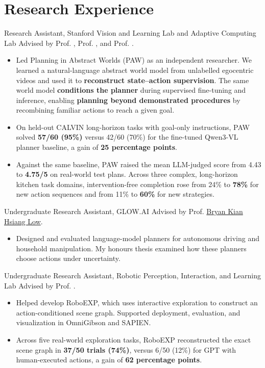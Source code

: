 \section{Research Experience}
  {Research Assistant, Stanford Vision and Learning Lab and Adaptive Computing Lab}{}
Advised by Prof. \jiajun, Prof. \david, and Prof. \weiyu.
\begin{itemize}
  \item Led Planning in Abstract Worlds (PAW) as an independent researcher. We learned a natural-language abstract world model from unlabelled egocentric videos and used it to \textbf{reconstruct state--action supervision}. The same world model \textbf{conditions the planner} during supervised fine-tuning and inference, enabling \textbf{planning beyond demonstrated procedures} by recombining familiar actions to reach a given goal.
  \item On held-out CALVIN long-horizon tasks with goal-only instructions, PAW solved \textbf{57/60 (95\%)} versus 42/60 (70\%) for the fine-tuned Qwen3-VL planner baseline, a gain of \textbf{25 percentage points}.
  \item Against the same baseline, PAW raised the mean LLM-judged score from 4.43 to \textbf{4.75/5} on real-world test plans. Across three complex, long-horizon kitchen task domains, intervention-free completion rose from 24\% to \textbf{78\%} for new action sequences and from 11\% to \textbf{60\%} for new strategies.
\end{itemize}
\newpage
{}
  {Undergraduate Research Assistant, GLOW.AI}{}
Advised by Prof. \href{https://www.comp.nus.edu.sg/cs/people/lowkh/}{Bryan Kian Hsiang Low}.
\begin{itemize}
  \item Designed and evaluated language-model planners for autonomous driving and household manipulation. My honours thesis examined how these planners choose actions under uncertainty.
\end{itemize}
\entryspace
{}
  {Undergraduate Research Assistant, Robotic Perception, Interaction, and Learning Lab}{}
Advised by Prof. \yunzhu.
\begin{itemize}
  \item Helped develop RoboEXP, which uses interactive exploration to construct an action-conditioned scene graph. Supported deployment, evaluation, and visualization in OmniGibson and SAPIEN.
  \item Across five real-world exploration tasks, RoboEXP reconstructed the exact scene graph in \textbf{37/50 trials (74\%)}, versus 6/50 (12\%) for GPT with human-executed actions, a gain of \textbf{62 percentage points}.
\end{itemize}
